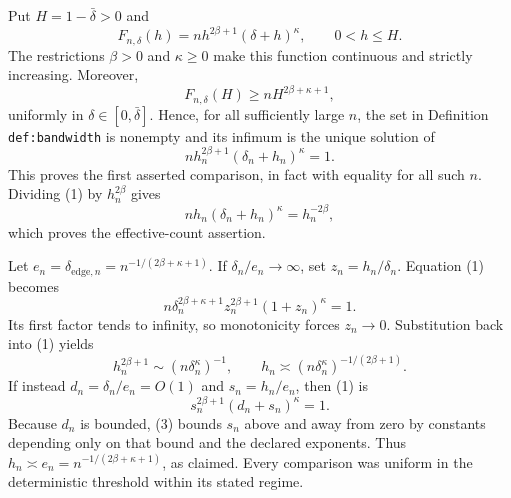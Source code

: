 Put \(H=1-\bar\delta>0\) and
\[
 F_{n,\delta}(h)=n h^{2\beta+1}(\delta+h)^\kappa,
 \qquad 0<h\leq H.
\]
The restrictions \(\beta>0\) and \(\kappa\geq0\) make this function continuous and strictly increasing.  Moreover,
\[
 F_{n,\delta}(H)\geq nH^{2\beta+\kappa+1},
\]
uniformly in \(\delta\in[0,\bar\delta]\).  Hence, for all sufficiently large \(n\), the set in Definition \texttt{def:bandwidth} is nonempty and its infimum is the unique solution of
\[
 n h_n^{2\beta+1}(\delta_n+h_n)^\kappa=1. \tag{1}
\]
This proves the first asserted comparison, in fact with equality for all such \(n\).  Dividing (1) by \(h_n^{2\beta}\) gives
\[
 n h_n(\delta_n+h_n)^\kappa=h_n^{-2\beta}, \tag{2}
\]
which proves the effective-count assertion.

Let \(e_n=\delta_{\mathrm{edge},n}=n^{-1/(2\beta+\kappa+1)}\).  If \(\delta_n/e_n\to\infty\), set \(z_n=h_n/\delta_n\).  Equation (1) becomes
\[
 n\delta_n^{2\beta+\kappa+1}z_n^{2\beta+1}(1+z_n)^\kappa=1.
\]
Its first factor tends to infinity, so monotonicity forces \(z_n\to0\).  Substitution back into (1) yields
\[
 h_n^{2\beta+1}\sim(n\delta_n^\kappa)^{-1},
 \qquad
 h_n\asymp(n\delta_n^\kappa)^{-1/(2\beta+1)}.
\]
If instead \(d_n=\delta_n/e_n=O(1)\) and \(s_n=h_n/e_n\), then (1) is
\[
 s_n^{2\beta+1}(d_n+s_n)^\kappa=1. \tag{3}
\]
Because \(d_n\) is bounded, (3) bounds \(s_n\) above and away from zero by constants depending only on that bound and the declared exponents.  Thus \(h_n\asymp e_n=n^{-1/(2\beta+\kappa+1)}\), as claimed.  Every comparison was uniform in the deterministic threshold within its stated regime.